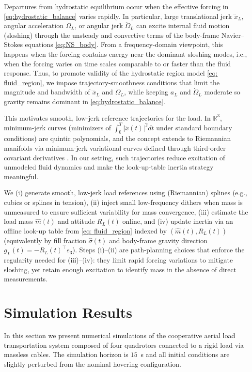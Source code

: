 \documentclass[letterpaper, 10 pt, conference]{ieeeconf}  %
\newcounter{part} %
\newcommand{\R}{\mathbb{R}}
\begin{document}
Departures from hydrostatic equilibrium occur when the effective forcing in \eqref{eq:hydrostatic_balance} varies rapidly. In particular, large translational jerk $\dddot{x}_L$, angular acceleration $\dot{\Omega}_L$, or angular jerk $\ddot{\Omega}_L$ can excite internal fluid motion (sloshing) through the unsteady and convective terms of the body-frame Navier--Stokes equations \eqref{eq:NS_body}. From a frequency-domain viewpoint, this happens when the forcing contains energy near the dominant sloshing modes, i.e., when the forcing varies on time scales comparable to or faster than the fluid response. Thus, to promote validity of the hydrostatic region model \eqref{eq: fluid_region}, we impose trajectory-smoothness conditions that limit the magnitude and bandwidth of $\dddot{x}_L$ and $\ddot{\Omega}_L$, while keeping $a_L$ and $\dot{\Omega}_L$ moderate so gravity remains dominant in \eqref{eq:hydrostatic_balance}.

This motivates smooth, low-jerk reference trajectories for the load. In $\R^3$, minimum-jerk curves (minimizers of $\int_0^T |\dddot{x}(t)|^2dt$ under standard boundary conditions) are quintic polynomials, and the concept extends to Riemannian manifolds via minimum-jerk variational curves defined through third-order covariant derivatives \cite{camarinha1995splines}. In our setting, such trajectories reduce excitation of unmodeled fluid dynamics and make the look-up-table inertia strategy meaningful.

We (i) generate smooth, low-jerk load references using (Riemannian) splines (e.g., cubics or splines in tension), (ii) inject small low-frequency dithers when mass is unmeasured to ensure sufficient variability for mass convergence, (iii) estimate the load mass $\hat m(t)$ and attitude $R_L(t)$ online, and (iv) update inertia via an offline look-up table from \eqref{eq: fluid_region} indexed by $(\hat m(t),R_L(t))$ (equivalently by fill fraction $\hat\sigma(t)$ and body-frame gravity direction $g_L(t)=-R_L(t)^\top e_3$). Steps (i)–(ii) are path-planning choices that enforce the regularity needed for (iii)–(iv): they limit rapid forcing variations to mitigate sloshing, yet retain enough excitation to identify mass in the absence of direct measurements.

\section{Simulation Results}

In this section we present numerical simulations of the cooperative aerial load transportation system composed of four quadrotors connected to a rigid load via massless cables.  The simulation horizon is $15$~s and all initial conditions are slightly perturbed from the nominal hovering configuration.
\end{document}
